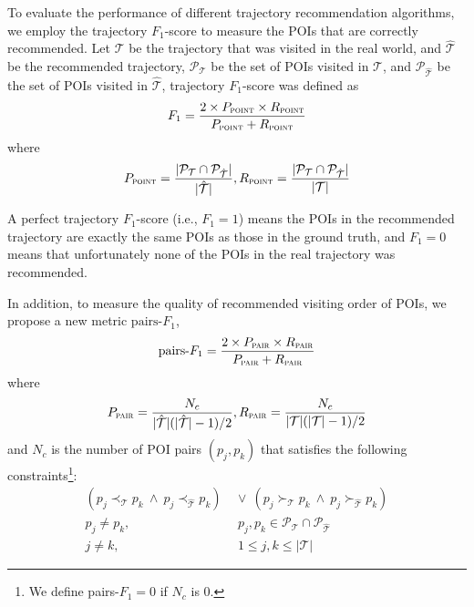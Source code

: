 To evaluate the performance of different trajectory recommendation algorithms,
we employ the trajectory $F_1$-score\cite{ijcai15} to measure the POIs that are
correctly recommended. Let $\mathcal{T}$ be the trajectory that was visited in the real world,
and $\hat{\mathcal{T}}$ be the recommended trajectory,
$\mathcal{P}_{\mathcal{T}}$ be the set of POIs visited in $\mathcal{T}$,
and $\mathcal{P}_{\hat{\mathcal{T}}}$ be the set of POIs visited in $\hat{\mathcal{T}}$,
trajectory $F_1$-score was defined as
\begin{displaymath}
F_1= \frac{2 \times P_{\textsc{point}} \times R_{\textsc{point}}}
          {P_{\textsc{point}} + R_{\textsc{point}}}
\end{displaymath}
where
\begin{displaymath}
P_{\textsc{point}} = \frac{|\mathcal{P}_{\mathcal{T}} \cap \mathcal{P}_{\hat{\mathcal{T}}}|}
                          {|\hat{\mathcal{T}}|},
R_{\textsc{point}} = \frac{|\mathcal{P}_{\mathcal{T}} \cap \mathcal{P}_{\hat{\mathcal{T}}}|}
                          {|\mathcal{T}|}
\end{displaymath}

A perfect trajectory $F_1$-score (i.e., $F_1 = 1$) means the POIs in
the recommended trajectory are exactly the same POIs as those in the ground truth,
and $F_1 = 0$ means that unfortunately none of the POIs in the
real trajectory was recommended.

In addition, to measure the quality of recommended visiting order of POIs,
we propose a new metric $\text{pairs-}F_1$,
\begin{displaymath}
\text{pairs-}F_1 = \frac{2 \times P_{\textsc{pair}} \times R_{\textsc{pair}}}
                       {P_{\textsc{pair}} + R_{\textsc{pair}}}
\end{displaymath}
where
\begin{displaymath}
P_{\textsc{pair}} = \frac{N_c} {|\hat{\mathcal{T}}|(|\hat{\mathcal{T}}|-1) / 2},
R_{\textsc{pair}} = \frac{N_c} {|\mathcal{T}|(|\mathcal{T}|-1) / 2}
\end{displaymath}
and $N_c$ is the number of POI pairs $(p_j, p_k)$ that satisfies the following
constraints\footnote{We define pairs-$F_1=0$ if $N_c$ is $0$.}:
\begin{align*}
    (p_j \prec_{\mathcal{T}} p_k ~\land~ p_j \prec_{\hat{\mathcal{T}}} p_k) & ~\lor~
    (p_j \succ_{\mathcal{T}} p_k ~\land~ p_j \succ_{\hat{\mathcal{T}}} p_k) \\
    p_j \ne p_k, &~~ p_j, p_k \in \mathcal{P}_{\mathcal{T}} \cap \mathcal{P}_{\hat{\mathcal{T}}} \\
    j \ne k, &~~ 1 \le j, k \le |\mathcal{T}|
\end{align*}

